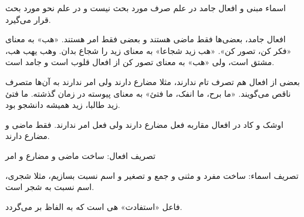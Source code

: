\documentclass{article}
\begin{document}
\begin{addpage}{5}
  \vspace*{3cm}
  \begin{note}
    اسماء مبنی و افعال جامد در علم صرف مورد بحث نیست و در علم نحو مورد بحث قرار می‌گیرد.
  \end{note}
  \begin{note}
    افعال جامد، بعضی‌ها فقط ماضی هستند و بعضی فقط امر هستند. «هب» به معنای «فکر کن، تصور کن». «هب زید شجاعا» به معنای زید را شجاع بدان.
    وهب یهب هب، مشتق است، ولی «هب» به معنای تصور کن از افعال قلوب است و جامد است.
  \end{note}
  \begin{note}
    بعضی از افعال هم تصرف تام ندارند، مثلا مضارع دارند ولی امر ندارند به آن‌ها متصرف ناقص می‌گویند. «ما برح، ما انفک، ما فتئ» به معنای پیوسته در زمان گذشته.
    ما فتئ زید طالبا، زید همیشه دانشجو بود.
  \end{note}
  \begin{note}
    اوشک و کاد در افعال مقاربه فعل مضارع دارند ولی فعل امر ندارند. فقط ماضی و مضارع دارند.
  \end{note}
  \vspace*{3cm}
  \begin{note}
    تصریف افعال: ساخت ماضی و مضارع و امر
  \end{note}
  \begin{note}
    تصریف اسماء: ساخت مفرد و مثنی و جمع و تصغیر و اسم نسبت بسازیم، مثلا شجری، اسم نسبت به شجر است.
  \end{note}
  \vspace*{1.4cm}
  \begin{note}
    فاعل «استفادت» هی است که به الفاظ بر می‌گردد.
  \end{note}
\end{addpage}
\end{document}
